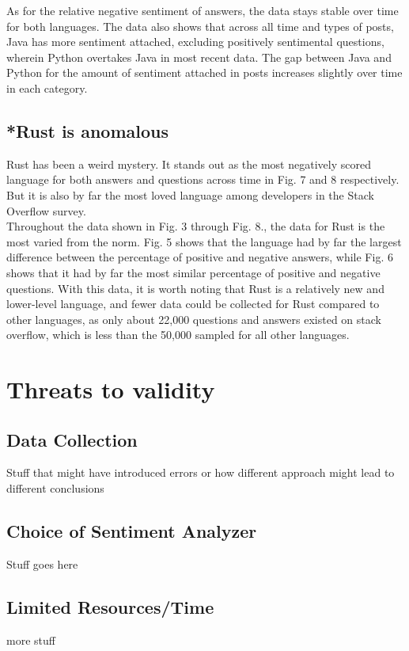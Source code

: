 \documentclass[conference]{IEEEtran}
\begin{document}
As for the relative negative sentiment of answers, the data stays stable over time for both languages. The data also shows that across all time and types of posts, Java has more sentiment attached, excluding positively sentimental questions, wherein Python overtakes Java in most recent data. The gap between Java and Python for the amount of sentiment attached in posts increases slightly over time in each category.\\

\subsection{*Rust is anomalous}
Rust has been a weird mystery. It  stands out as the most negatively scored language for both answers and questions across time in Fig. 7 and 8 respectively. But it is also by far the most loved language among developers in the Stack Overflow survey. \\

Throughout the data shown in Fig. 3 through Fig. 8., the data for Rust is the most varied from the norm. Fig. 5 shows that the language had by far the largest difference between the percentage of positive and negative answers, while Fig. 6 shows that it had by far the most similar percentage of positive and negative questions. With this data, it is worth noting that Rust is a relatively new and lower-level language, and fewer data could be collected for Rust compared to other languages, as only about 22,000 questions and answers existed on stack overflow, which is less than the 50,000 sampled for all other languages.\\

\section{Threats to validity}

\subsection{Data Collection}
Stuff that might have introduced errors or how different approach might lead to different conclusions

\subsection{Choice of Sentiment Analyzer}
Stuff goes here

\subsection{Limited Resources/Time}
more stuff
\end{document}

